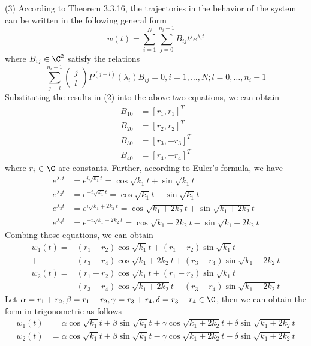 (3) According to Theorem 3.3.16, the trajectories in the behavior of the system can be written in the following general form
\begin{equation}
    w(t) = \sum_{i=1}^N\sum_{j=0}^{n_i-1}B_{ij}t^je^{\lambda_it}
\end{equation}
where $B_{ij}\in\C^2$ satisfy the relations
\begin{equation}
    \sum_{j=l}^{n_i-1}\begin{pmatrix}j\\l\end{pmatrix}P^{(j-l)}(\lambda_i)B_{ij} = 0, i = 1, \dots, N; l = 0, \dots, n_i-1
\end{equation}
Substituting the results in (2) into the above two equations, we can obtain
\begin{align}
    B_{10} &= [r_1, r_1]^T \\
    B_{20} &= [r_2, r_2]^T \\
    B_{30} &= [r_3, -r_3]^T\\
    B_{40} &= [r_4, -r_4]^T
\end{align}
where $r_i\in\C$ are constants. Further, according to Euler's formula, we have
\begin{align}
    e^{\lambda_1t} &= e^{i\sqrt{k_1}t} = \cos\sqrt{k_1}t + \sin\sqrt{k_1}t \\
    e^{\lambda_2t} &= e^{-i\sqrt{k_1}t} = \cos\sqrt{k_1}t - \sin\sqrt{k_1}t \\
    e^{\lambda_3t} &= e^{i\sqrt{k_1+2k_2}t} = \cos\sqrt{k_1+2k_2}t + \sin\sqrt{k_1+2k_2}t \\
    e^{\lambda_4t} &= e^{-i\sqrt{k_1+2k_2}t} = \cos\sqrt{k_1+2k_2}t - \sin\sqrt{k_1+2k_2}t 
\end{align}
Combing those equations, we can obtain
\begin{align}
    w_1(t) = &(r_1+r_2)\cos\sqrt{k_1}t + (r_1-r_2)\sin\sqrt{k_1}t \\+ &(r_3+r_4)\cos\sqrt{k_1+2k_2}t + (r_3-r_4)\sin\sqrt{k_1+2k_2}t
\end{align}
\begin{align}
    w_2(t) = &(r_1+r_2)\cos\sqrt{k_1}t + (r_1-r_2)\sin\sqrt{k_1}t \\- &(r_3+r_4)\cos\sqrt{k_1+2k_2}t - (r_3-r_4)\sin\sqrt{k_1+2k_2}t
\end{align}
Let $\alpha=r_1+r_2, \beta=r_1-r_2, \gamma=r_3+r_4,\delta=r_3-r_4 \in \C$, then we can obtain the form in trigonometric as follows
\begin{align}
    w_1(t) &= \alpha\cos\sqrt{k_1}t + \beta\sin\sqrt{k_1}t + \gamma\cos\sqrt{k_1+2k_2}t + \delta\sin\sqrt{k_1+2k_2}t\\
    w_2(t) &= \alpha\cos\sqrt{k_1}t + \beta\sin\sqrt{k_1}t - \gamma\cos\sqrt{k_1+2k_2}t - \delta\sin\sqrt{k_1+2k_2}t
\end{align}

